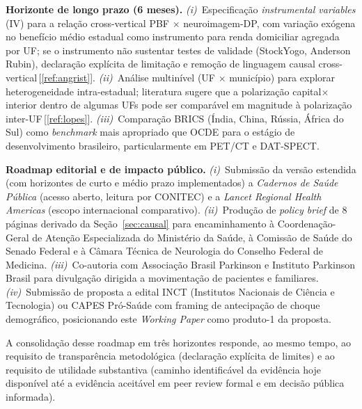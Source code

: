 \documentclass[12pt,a4paper,oneside]{article}
\begin{document}
\textbf{Horizonte de longo prazo (6 meses).}
\textit{(i)}~Especificação \textit{instrumental variables} (IV)
para a relação cross-vertical PBF $\times$ neuroimagem-DP, com
variação exógena no benefício médio estadual como instrumento
para renda domiciliar agregada por UF; se o instrumento não
sustentar testes de validade (Stock\textendash Yogo, Anderson\textendash
Rubin), declaração explícita de limitação e remoção de
linguagem causal cross-vertical\,[\ref{ref:angrist}].
\textit{(ii)}~Análise multinível (UF $\times$ município) para
explorar heterogeneidade intra-estadual; literatura sugere que
a polarização capital$\times$interior dentro de algumas UFs pode
ser comparável em magnitude à polarização inter-UF\,[\ref{ref:lopes}].
\textit{(iii)}~Comparação BRICS (Índia, China, Rússia, África do
Sul) como \textit{benchmark} mais apropriado que OCDE para o
estágio de desenvolvimento brasileiro, particularmente em PET/CT
e DAT-SPECT.

\textbf{Roadmap editorial e de impacto público.}
\textit{(i)}~Submissão da versão estendida (com horizontes de
curto e médio prazo implementados) a \textit{Cadernos de Saúde
Pública} (acesso aberto, leitura por CONITEC) e a \textit{Lancet
Regional Health \textendash{} Americas} (escopo internacional
comparativo). \textit{(ii)}~Produção de \textit{policy brief} de
8 páginas derivado da Seção~\ref{sec:causal} para
encaminhamento à Coordenação-Geral de Atenção Especializada do
Ministério da Saúde, à Comissão de Saúde do Senado Federal e à
Câmara Técnica de Neurologia do Conselho Federal de Medicina.
\textit{(iii)}~Co-autoria com Associação Brasil Parkinson e
Instituto Parkinson Brasil para divulgação dirigida a
movimentação de pacientes e familiares. \textit{(iv)}~Submissão
de proposta a edital INCT (Institutos Nacionais de Ciência e
Tecnologia) ou CAPES Pró-Saúde com framing de antecipação de
choque demográfico, posicionando este \textit{Working Paper}
como produto-1 da proposta.

A consolidação desse roadmap em três horizontes responde, ao
mesmo tempo, ao requisito de transparência metodológica
(declaração explícita de limites) e ao requisito de utilidade
substantiva (caminho identificável da evidência hoje disponível
até a evidência aceitável em peer review formal e em decisão
pública informada).

\end{document}
